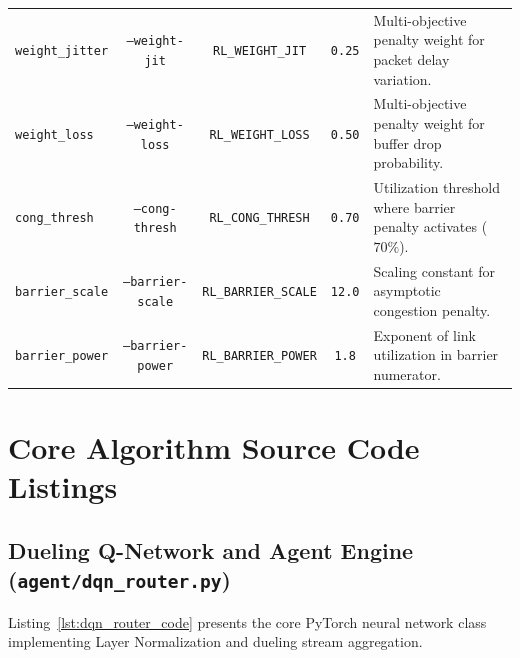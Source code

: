 \documentclass[12pt,a4paper,oneside]{report}
\begin{document}
\begin{table}[htbp]
\begin{tabularx}{\textwidth}{l c c c X}
\texttt{weight\_jitter} & \texttt{--weight-jit} & \texttt{RL\_WEIGHT\_JIT} & \texttt{0.25} & Multi-objective penalty weight for packet delay variation. \\
\texttt{weight\_loss} & \texttt{--weight-loss} & \texttt{RL\_WEIGHT\_LOSS} & \texttt{0.50} & Multi-objective penalty weight for buffer drop probability. \\
\texttt{cong\_thresh} & \texttt{--cong-thresh} & \texttt{RL\_CONG\_THRESH} & \texttt{0.70} & Utilization threshold where barrier penalty activates ($70\%$). \\
\texttt{barrier\_scale} & \texttt{--barrier-scale} & \texttt{RL\_BARRIER\_SCALE} & \texttt{12.0} & Scaling constant for asymptotic congestion penalty. \\
\texttt{barrier\_power} & \texttt{--barrier-power} & \texttt{RL\_BARRIER\_POWER} & \texttt{1.8} & Exponent of link utilization in barrier numerator. \\
\bottomrule
\end{tabularx}
\end{table}


\chapter{Core Algorithm Source Code Listings}
\label{app:listings}

\section{Dueling Q-Network and Agent Engine (\texttt{agent/dqn\_router.py})}
Listing~\ref{lst:dqn_router_code} presents the core PyTorch neural network class implementing Layer Normalization and dueling stream aggregation.
\end{document}
